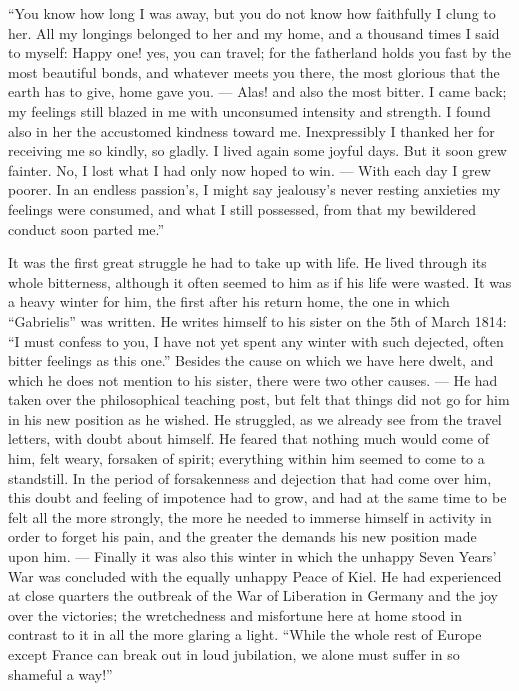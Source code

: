 \documentclass[12pt,a4paper,openany]{book}
\newcommand{\opage}[1]{\marginnote{\footnotesize\textit{[#1]}}}
\begin{document}
``You know how long I was away, but you do not know
how faithfully I clung to her. All my longings
belonged to her and my home, and a thousand times I said to
myself: Happy one! yes, you can travel; for the fatherland holds you fast by
the most beautiful bonds, and whatever meets you there, the most glorious that
the earth has to give, home gave you. ---
Alas! and also the most bitter. I came back; my feelings
still blazed in me with unconsumed intensity and strength.
I found also in her the accustomed kindness toward me.
Inexpressibly I thanked her for receiving me so
kindly, so gladly. I lived again some joyful days. But
it soon grew fainter. No, I lost what I had only now
hoped to win. --- With each day I grew poorer.
In an endless passion's, I might say jealousy's never
resting anxieties my feelings were consumed, and what I
still possessed, from that my bewildered conduct soon parted me.''

\opage{67}It was the first great struggle he had to take up with
life. He lived through its whole bitterness, although it
often seemed to him as if his life were wasted. It was a
heavy winter for him, the first after his return home, the one
in which ``Gabrielis'' was written. He writes himself to his
sister on the 5th of March 1814: ``I must confess to you,
I have not yet spent any winter with such dejected,
often bitter feelings as this one.'' Besides the
cause on which we have here dwelt, and which he does not mention
to his sister, there were two other causes. --- He had
taken over the philosophical teaching post, but felt that things
did not go for him in his new position as he wished. He
struggled, as we already see from the travel letters, with doubt about
himself. He feared that nothing much would come of
him, felt weary, forsaken of spirit; everything within him seemed to
come to a standstill. In the period of forsakenness and dejection that had
come over him, this doubt and feeling of impotence had to
grow, and had at the same time to be felt all the more strongly, the more
he needed to immerse himself in activity in order to forget
his pain, and the greater the demands his new position made
upon him. --- Finally it was also this winter in which
the unhappy Seven Years' War was concluded with the equally
unhappy Peace of Kiel. He had experienced at close quarters
the outbreak of the War of Liberation in Germany and the joy over the victories;
the wretchedness and misfortune here at home stood in contrast
to it in all the more glaring a light. ``While the whole
rest of Europe except France can break out in loud jubilation,
we alone must suffer in so shameful a way!''
\end{document}
